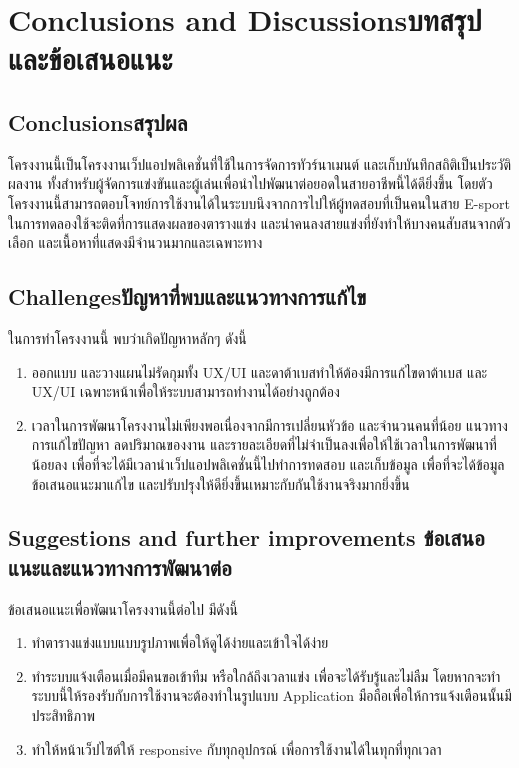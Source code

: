\chapter{\ifenglish Conclusions and Discussions\else บทสรุปและข้อเสนอแนะ\fi}

\section{\ifenglish Conclusions\else สรุปผล\fi}

โครงงานนี้เป็นโครงงานเว็ปแอปพลิเคชั่นที่ใช้ในการจัดการทัวร์นาเมนต์ และเก็บบันทึกสถิติเป็นประวัติผลงาน
ทั้งสำหรับผู้จัดการแข่งขันและผู้เล่นเพื่อนำไปพัฒนาต่อยอดในสายอาชีพนี้ได้ดียิ่งขึ้น
โดยตัวโครงงานนี้สามารถตอบโจทย์การใช้งานได้ในระบบนึงจากการไปให้ผู้ทดสอบที่เป็นคนในสาย E-sport 
ในการทดลองใช้จะติดที่การแสดงผลของตารางแข่ง และนำคนลงสายแข่งที่ยังทำให้บางคนสับสนจากตัวเลือก และเนื้อหาที่แสดงมีจำนวนมากและเฉพาะทาง
\section{\ifenglish Challenges\else ปัญหาที่พบและแนวทางการแก้ไข\fi}

ในการทำโครงงานนี้ พบว่าเกิดปัญหาหลักๆ ดังนี้

\begin{enumerate}
    \item ออกแบบ และวางแผนไม่รัดกุมทั้ง UX/UI และดาต้าเบสทำให้ต้องมีการแก้ไขดาต้าเบส และ UX/UI เฉพาะหน้าเพื่อให้ระบบสามารถทำงานได้อย่างถูกต้อง
    \item เวลาในการพัฒนาโครงงานไม่เพียงพอเนื่องจากมีการเปลี่ยนหัวข้อ และจำนวนคนที่น้อย แนวทางการแก้ไขปัญหา ลดปริมาณของงาน และรายละเอียดที่ไม่จำเป็นลงเพื่อให้ใช้เวลาในการพัฒนาที่น้อยลง 
    เพื่อที่จะได้มีเวลานำเว็ปแอปพลิเคชั่นนี้ไปทำการทดสอบ และเก็บข้อมูล เพื่อที่จะได้ข้อมูลข้อเสนอแนะมาแก้ไข และปรับปรุงให้ดียิ่งขึ้นเหมาะกับกันใช้งานจริงมากยิ่งขึ้น
\end{enumerate}

\section{\ifenglish%
Suggestions and further improvements
\else%
ข้อเสนอแนะและแนวทางการพัฒนาต่อ
\fi
}

ข้อเสนอแนะเพื่อพัฒนาโครงงานนี้ต่อไป มีดังนี้

\begin{enumerate}
    \item ทำตารางแข่งแบบแบบรูปภาพเพื่อให้ดูได้ง่ายและเข้าใจได้ง่าย
    \item ทำระบบแจ้งเตือนเมื่อมีคนขอเข้าทีม หรือใกล้ถึงเวลาแข่ง เพื่อจะได้รับรู้และไม่ลืม โดยหากจะทำระบบนี้ให้รองรับกับการใช้งานจะต้องทำในรูปแบบ Application มือถือเพื่อให้การแจ้งเตือนนั้นมีประสิทธิภาพ
    \item ทำให้หน้าเว็ปไซต์ให้ responsive กับทุกอุปกรณ์ เพื่อการใช้งานได้ในทุกที่ทุกเวลา
\end{enumerate}
